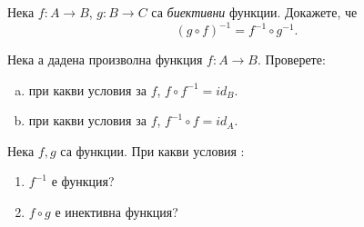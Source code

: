 \begin{problem}
  Нека $f: A\to B$, $g: B\to C$ са {\em биективни} функции.
  Докажете, че
  \[(g\circ f)^{-1} = f^{-1}\circ g^{-1}.\]
\end{problem}

\begin{problem}
  Нека а дадена произволна функция $f:A \to B$.
  Проверете:
  \begin{enumerate}[a)]
  \item
    при какви условия за $f$, $f\circ f^{-1} = id_{B}$.
  \item
     при какви условия за $f$, $f^{-1}\circ f = id_{A}$.
  \end{enumerate}
\end{problem}
\newpage
\begin{problem}%
  Нека $f,g$ са функции. При какви условия :
  \begin{enumerate}
  \item
    $f^{-1}$ е функция?
  \item
    $f\circ g$ е инективна функция?
  \end{enumerate}
\end{problem}

